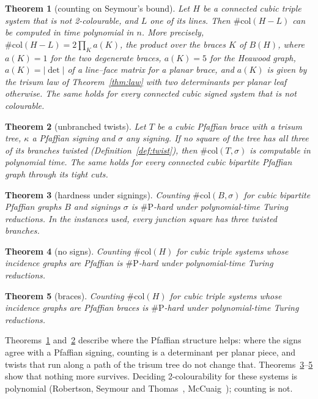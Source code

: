 \documentclass[11pt]{article}
\newtheorem{theorem}{Theorem}
\theoremstyle{definition}
\theoremstyle{remark}
\newcommand{\sharpP}{\#\mathrm{P}}
\newcommand{\col}{\#\mathrm{col}}
\begin{document}
\begin{theorem}[counting on Seymour's bound]\label{thm:A}
Let $H$ be a connected cubic triple system that is not 2-colourable, and $L$
one of its lines. Then $\col(H-L)$ can be computed in time polynomial in $n$.
More precisely, $\col(H-L)=2\prod_{K}a(K)$, the product over the braces $K$ of
$B(H)$, where $a(K)=1$ for the two degenerate braces, $a(K)=5$ for the Heawood
graph, $a(K)=|\det|$ of a line--face matrix for a planar brace, and $a(K)$ is
given by the trisum law of Theorem~\ref{thm:law} with two determinants per
planar leaf otherwise. The same holds for every connected cubic signed system
that is not colourable.
\end{theorem}

\begin{theorem}[unbranched twists]\label{thm:B}
Let $T$ be a cubic Pfaffian brace with a trisum tree, $\kappa$ a Pfaffian
signing and $\sigma$ any signing. If no square of the tree has all three of
its branches twisted (Definition~\ref{def:twist}), then $\col(T,\sigma)$ is
computable in polynomial time. The same holds for every connected cubic
bipartite Pfaffian graph through its tight cuts.
\end{theorem}

\begin{theorem}[hardness under signings]\label{thm:C}
Counting $\col(B,\sigma)$ for cubic bipartite Pfaffian graphs $B$ and
signings $\sigma$ is $\sharpP$-hard under polynomial-time Turing reductions.
In the instances used, every junction square has three twisted branches.
\end{theorem}

\begin{theorem}[no signs]\label{thm:D}
Counting $\col(H)$ for cubic triple systems whose incidence graphs are
Pfaffian is $\sharpP$-hard under polynomial-time Turing reductions.
\end{theorem}

\begin{theorem}[braces]\label{thm:E}
Counting $\col(H)$ for cubic triple systems whose incidence graphs are
Pfaffian braces is $\sharpP$-hard under polynomial-time Turing reductions.
\end{theorem}

Theorems~\ref{thm:A} and~\ref{thm:B} describe where the Pfaffian structure
helps: where the signs agree with a Pfaffian signing, counting is a
determinant per planar piece, and twists that run along a path of the trisum
tree do not change that. Theorems~\ref{thm:C}--\ref{thm:E} show that nothing
more survives. Deciding 2-colourability for these systems is polynomial
(Robertson, Seymour and Thomas~\cite{RST99}, McCuaig~\cite{McC04}); counting
is not.
\end{document}
